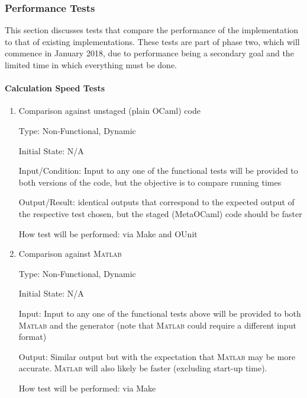 \documentclass[12pt, titlepage]{article}
\begin{document}
\subsubsection{Performance Tests}
This section discusses tests that compare the performance of the implementation 
to that of existing implementations.
These tests are part of phase two, which will commence in January 2018, due to 
performance being a secondary goal and the limited time in which everything 
must be done.
\paragraph{Calculation Speed Tests}

\begin{enumerate}

\item{Comparison against unstaged (plain OCaml) code\\}

Type: Non-Functional, Dynamic
					
Initial State: N/A
					
Input/Condition: Input to any one of the functional tests will be provided to 
both versions 
of the code, but the objective is to compare running times
					
Output/Result: identical outputs that correspond to the expected output of the 
respective test chosen, but the staged (MetaOCaml) code should be 
faster
					
How test will be performed: via Make and OUnit
					
\item{Comparison against \textsc{\textsc{Matlab}}\\}

Type: Non-Functional, Dynamic
					
Initial State: N/A
					
Input: Input to any one of the functional tests above will be provided to both 
\textsc{Matlab} and the generator (note that \textsc{Matlab} could require a 
different input 
format)
					
Output: Similar output but with the expectation that \textsc{Matlab} may be 
more 
accurate. \textsc{Matlab} will also likely be faster (excluding start-up time).
					
How test will be performed: via Make



\end{enumerate}
\end{document}
